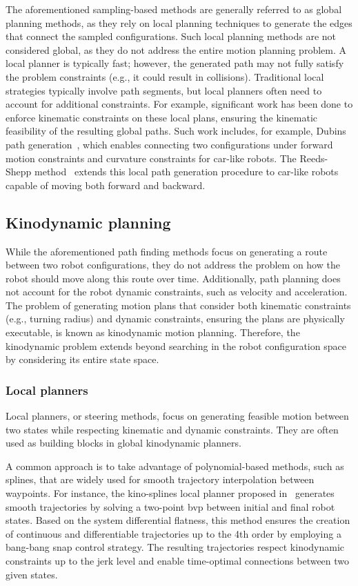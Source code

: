 The aforementioned sampling-based methods are generally referred to as global planning methods, as they rely on local planning techniques to generate the edges that connect the sampled configurations.
Such local planning methods are not considered global, as they do not address the entire motion planning problem. 
A local planner is typically fast; however, the generated path may not fully satisfy the problem constraints (e.g., it could result in collisions).
Traditional local strategies typically involve path segments, but local planners often need to account for additional constraints.
For example, significant work has been done to enforce kinematic constraints on these local plans, ensuring the kinematic feasibility of the resulting global paths.
Such work includes, for example, Dubins path generation~\cite{cDubins}, which enables connecting two configurations under forward motion constraints and curvature constraints for car-like robots. 
The Reeds-Shepp method~\cite{cReeds} extends this local path generation procedure to car-like robots capable of moving both forward and backward.

\subsection{Kinodynamic planning}

While the aforementioned path finding methods focus on generating a route between two robot configurations, they do not address the problem on how the robot should move along this route over time.
Additionally, path planning does not account for the robot dynamic constraints, such as velocity and acceleration. 
The problem of generating motion plans that consider both kinematic constraints (e.g., turning radius) and dynamic constraints, ensuring the plans are physically executable, is known as kinodynamic motion planning.
Therefore, the kinodynamic problem extends beyond searching in the robot configuration space by considering its entire state space.

\subsubsection{Local planners}

Local planners, or steering methods, focus on generating feasible motion between two states while respecting kinematic and dynamic constraints. 
They are often used as building blocks in global kinodynamic planners. 

A common approach is to take advantage of polynomial-based methods, such as splines, that are widely used for smooth trajectory interpolation between waypoints.
For instance, the kino-splines local planner proposed in~\cite{cKino} generates smooth trajectories by solving a two-point \gls{bvp} between initial and final robot states. 
Based on the system differential flatness, this method ensures the creation of continuous and differentiable trajectories up to the 4th order by employing a bang-bang snap control strategy. 
The resulting trajectories respect kinodynamic constraints up to the jerk level and enable time-optimal connections between two given states.

